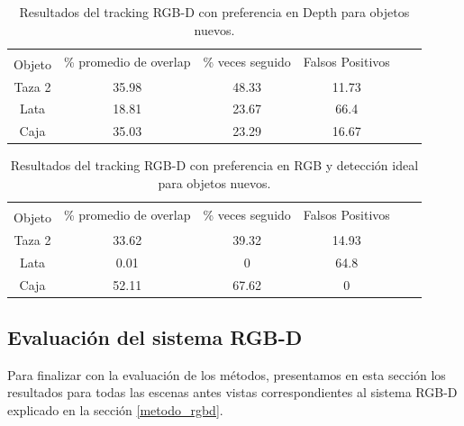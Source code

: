 \begin{table}[h]
    \begin{tabular}{|c|c|c|c|c|c|}
    \hline
    & \multirow{2}{2.4cm}{\% promedio de overlap} & \multirow{2}{2cm}{\% veces seguido} & \multirow{2}{1.6cm}{Falsos Positivos}\\
	Objeto & & &\\
    \hline
    Taza 2  & 35.98      & 48.33             & 11.73 \\
    \hline
    Lata    & 18.81      & 23.67             &  66.4 \\
    \hline
    Caja    & 35.03      & 23.29             & 16.67 \\
    \hline
    \end{tabular}
\caption{Resultados del tracking RGB-D con preferencia en Depth para objetos nuevos.}
\label{tabla_rgbd_d_nuevos}
\end{table}

\begin{table}[h]
    \begin{tabular}{|c|c|c|c|c|c|}
    \hline
    & \multirow{2}{2.4cm}{\% promedio de overlap} & \multirow{2}{2cm}{\% veces seguido} & \multirow{2}{1.6cm}{Falsos Positivos}\\
	Objeto & & &\\
    \hline
    Taza 2  & 33.62      & 39.32             & 14.93\\
    \hline
    Lata    &  0.01      &     0             &  64.8\\
    \hline
    Caja    & 52.11      & 67.62             &     0\\
    \hline
    \end{tabular}
\caption{Resultados del tracking RGB-D con preferencia en RGB y detección ideal para objetos nuevos.}
\label{tabla_rgbd_rgb_nuevos}
\end{table}



\subsection{Evaluación del sistema RGB-D}
Para finalizar con la evaluación de los métodos, presentamos en esta sección los resultados para todas las escenas antes vistas correspondientes al sistema RGB-D explicado en la sección \ref{metodo_rgbd}.

